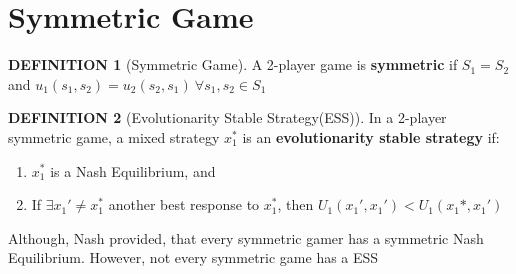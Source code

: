 \documentclass[12pt]{article}
\theoremstyle{definition}
\newtheorem*{definition}{DEFINITION}
\begin{document}
\section{Symmetric Game}
    \begin{definition}[Symmetric Game]
        A 2-player game is \textbf{symmetric} if $S_1 = S_2$ and $u_1(s_1,s_2) = u_2(s_2,s_1) \ \forall s_1,s_2 \in S_1 $
    \end{definition}
    \begin{definition}[Evolutionarity Stable Strategy(ESS)]
        In a 2-player symmetric game, a mixed strategy $x_1^*$ is an \textbf{evolutionarity stable strategy} if:
            \begin{enumerate}
                \item $x_1^*$ is a Nash Equilibrium, and
                \item If $\exists x_1' \neq x_1^*$ another best response to $x_1^*$, then $U_1(x_1',x_1') < U_1(x_1*,x_1')$
            \end{enumerate}
    \end{definition}
    Although, Nash provided, that every symmetric gamer has a symmetric Nash Equilibrium. However, not every symmetric game has a ESS  
\end{document}
